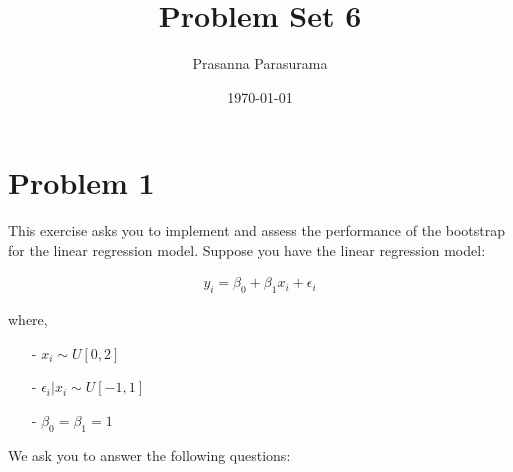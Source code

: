 \documentclass[10pt,notitlepage,onecolumn,aps,pra]{revtex4-1}
\begin{document}
    
    
    \title{Problem Set 6}\author{Prasanna Parasurama}

\date{\today}
\maketitle


    
    

    
    \section{Problem 1}\label{problem-1}

    This exercise asks you to implement and assess the performance of the
bootstrap for the linear regression model. Suppose you have the linear
regression model:

\begin{align*}
  y_{i} = \beta_{0} + \beta_{1}x_{i} + \epsilon_{i}
\end{align*}

where,

\begin{itemize}
  \item[-] $x_{i} \sim U[0,2]$
  \item[-] $\epsilon_{i} \vert x_{i} \sim U[-1,1]$
  \item[-] $\beta_{0} = \beta_{1} = 1$ 
\end{itemize}

We ask you to answer the following questions:
\end{document}
